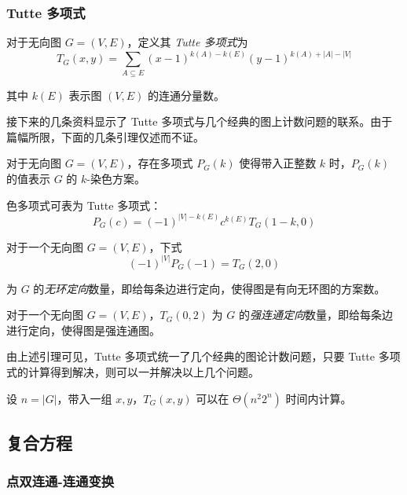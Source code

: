 \subsubsection{Tutte 多项式}

\begin{definition}
对于无向图 $G = (V, E)$，定义其 \emph{Tutte 多项式}为
$$T_G(x,y)=\sum_{A\subseteq E}(x-1)^{k(A)-k(E)}(y-1)^{k(A)+|A|-|V|}$$

其中 $k(E)$ 表示图 $(V, E)$ 的连通分量数。
\end{definition}

接下来的几条资料显示了 Tutte 多项式与几个经典的图上计数问题的联系。由于篇幅所限，下面的几条引理仅述而不证。

\begin{definition}[色多项式]
对于无向图 $G = (V, E)$，存在多项式 $P_G(k)$ 使得带入正整数 $k$ 时，$P_G(k)$ 的值表示 $G$ 的 $k$-染色方案。
\end{definition}

\begin{lemma}
色多项式可表为 Tutte 多项式：
$$P_G(c)=(-1)^{|V|-k(E)}c^{k(E)}T_G(1-k, 0)$$
\end{lemma}

\begin{lemma}
对于一个无向图 $G = (V, E)$，下式
$$(-1)^{|V|}P_G(-1)=T_G(2,0)$$

为 $G$ 的\emph{无环定向}数量，即给每条边进行定向，使得图是有向无环图的方案数。
\end{lemma}

\begin{lemma}
对于一个无向图 $G = (V, E)$，$T_G(0,2)$ 为 $G$ 的\emph{强连通定向}数量，即给每条边进行定向，使得图是强连通图。
\end{lemma}

由上述引理可见，Tutte 多项式统一了几个经典的图论计数问题，只要 Tutte 多项式的计算得到解决，则可以一并解决以上几个问题。

\begin{theorem}
设 $n=|G|$，带入一组 $x,y$，$T_G(x,y)$ 可以在 $\Theta(n^2 2^n)$ 时间内计算。
\end{theorem}

\subsection{复合方程}

\subsubsection{点双连通-连通变换}

